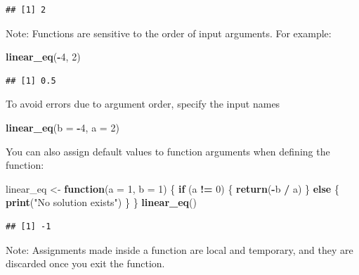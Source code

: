 \documentclass[
]{article}
\newenvironment{Shaded}{\begin{snugshade}}{\end{snugshade}}
\newcommand{\AttributeTok}[1]{\textcolor[rgb]{0.13,0.29,0.53}{#1}}
\newcommand{\ControlFlowTok}[1]{\textcolor[rgb]{0.13,0.29,0.53}{\textbf{#1}}}
\newcommand{\DecValTok}[1]{\textcolor[rgb]{0.00,0.00,0.81}{#1}}
\newcommand{\FunctionTok}[1]{\textcolor[rgb]{0.13,0.29,0.53}{\textbf{#1}}}
\newcommand{\NormalTok}[1]{#1}
\newcommand{\OtherTok}[1]{\textcolor[rgb]{0.56,0.35,0.01}{#1}}
\newcommand{\SpecialCharTok}[1]{\textcolor[rgb]{0.81,0.36,0.00}{\textbf{#1}}}
\newcommand{\StringTok}[1]{\textcolor[rgb]{0.31,0.60,0.02}{#1}}
\begin{document}
\begin{verbatim}
## [1] 2
\end{verbatim}

Note: Functions are sensitive to the order of input arguments. For
example:

\begin{Shaded}
\begin{Highlighting}[]
\FunctionTok{linear\_eq}\NormalTok{(}\SpecialCharTok{{-}}\DecValTok{4}\NormalTok{, }\DecValTok{2}\NormalTok{)}
\end{Highlighting}
\end{Shaded}

\begin{verbatim}
## [1] 0.5
\end{verbatim}

To avoid errors due to argument order, specify the input names

\begin{Shaded}
\begin{Highlighting}[]
\FunctionTok{linear\_eq}\NormalTok{(}\AttributeTok{b =} \SpecialCharTok{{-}}\DecValTok{4}\NormalTok{, }\AttributeTok{a =} \DecValTok{2}\NormalTok{)}
\end{Highlighting}
\end{Shaded}

You can also assign default values to function arguments when defining
the function:

\begin{Shaded}
\begin{Highlighting}[]
\NormalTok{linear\_eq }\OtherTok{\textless{}{-}} \ControlFlowTok{function}\NormalTok{(}\AttributeTok{a =} \DecValTok{1}\NormalTok{, }\AttributeTok{b =} \DecValTok{1}\NormalTok{) \{}
  \ControlFlowTok{if}\NormalTok{ (a }\SpecialCharTok{!=} \DecValTok{0}\NormalTok{) \{}
    \FunctionTok{return}\NormalTok{(}\SpecialCharTok{{-}}\NormalTok{b }\SpecialCharTok{/}\NormalTok{ a)}
\NormalTok{  \} }\ControlFlowTok{else}\NormalTok{ \{}
    \FunctionTok{print}\NormalTok{(}\StringTok{"No solution exists"}\NormalTok{)}
\NormalTok{  \}}
\NormalTok{\}}
\FunctionTok{linear\_eq}\NormalTok{()}
\end{Highlighting}
\end{Shaded}

\begin{verbatim}
## [1] -1
\end{verbatim}

Note: Assignments made inside a function are local and temporary, and
they are discarded once you exit the function.
\end{document}
